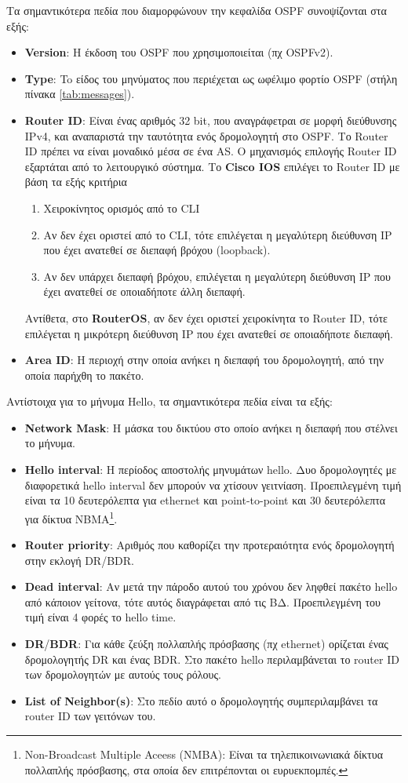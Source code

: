 \documentclass{EdipyLabs} %
\begin{document}
Τα σημαντικότερα πεδία που διαμορφώνουν την κεφαλίδα OSPF συνοψίζονται στα εξής: 
\begin{itemize}
	\item \textbf{Version}: H έκδοση του OSPF που χρησιμοποιείται (πχ OSPFv2).
	\item \textbf{Type}: To είδος του μηνύματος που περιέχεται ως ωφέλιμο φορτίο OSPF  (στήλη πίνακα \ref{tab:messages}).
	\item \textbf{Router ID}\label{router-id}: Είναι ένας αριθμός 32 bit, που αναγράφετραι σε μορφή διεύθυνσης IPv4, και αναπαριστά την ταυτότητα ενός δρομολογητή στο OSPF. Το Router ID πρέπει να είναι μοναδικό μέσα σε ένα AS. Ο μηχανισμός επιλογής Router ID εξαρτάται από το λειτουργικό σύστημα. Το \textbf{Cisco IOS} επιλέγει το Router ID με βάση τα εξής κριτήρια
	\begin{enumerate}
		\item Χειροκίνητος ορισμός από το CLI 
		\item Αν δεν έχει οριστεί από το CLI, τότε επιλέγεται η μεγαλύτερη διεύθυνση IP που έχει ανατεθεί σε διεπαφή βρόχου (loopback).
		\item Αν δεν υπάρχει διεπαφή βρόχου, επιλέγεται η μεγαλύτερη διεύθυνση IP που έχει ανατεθεί σε οποιαδήποτε άλλη διεπαφή. 
	\end{enumerate}
	Αντίθετα, στο \textbf{RouterOS}, αν δεν έχει οριστεί χειροκίνητα το Router ID, τότε επιλέγεται η μικρότερη διεύθυνση IP που έχει ανατεθεί σε οποιαδήποτε διεπαφή.
	\item \textbf{Area ID}: H περιοχή στην οποία ανήκει η διεπαφή του δρομολογητή, από την οποία παρήχθη το πακέτο.
\end{itemize}

Αντίστοιχα για το μήνυμα Hello, τα σημαντικότερα πεδία είναι τα εξής:
\begin{itemize}
	\item \textbf{Network Mask}: H μάσκα του δικτύου στο οποίο ανήκει η διεπαφή που στέλνει το μήνυμα.
	\item \textbf{Hello interval}: Η περίοδος αποστολής μηνυμάτων hello. Δυο δρομολογητές με διαφορετικά hello interval δεν μπορούν να χτίσουν γειτνίαση. Προεπιλεγμένη τιμή είναι τα 10 δευτερόλεπτα για ethernet και point-to-point και 30 δευτερόλεπτα για δίκτυα ΝΒΜΑ\footnote{Non-Broadcast Multiple Aceess (ΝΜΒΑ): Είναι τα τηλεπικοινωνιακά δίκτυα πολλαπλής πρόσβασης, στα οποία δεν επιτρέπονται οι ευρυεκπομπές.}.
	\item \textbf{Router priority}: Αριθμός που καθορίζει την προτεραιότητα ενός δρομολογητή στην εκλογή DR/BDR.
	\item \textbf{Dead interval}: Αν μετά την πάροδο αυτού του χρόνου δεν ληφθεί πακέτο hello από κάποιον γείτονα, τότε αυτός διαγράφεται από τις ΒΔ. Προεπιλεγμένη του τιμή είναι 4 φορές το hello time.
	\item \textbf{DR}/\textbf{BDR}: Για κάθε ζεύξη πολλαπλής πρόσβασης (πχ ethernet) ορίζεται ένας δρομολογητής DR και ένας BDR. Στο πακέτο hello περιλαμβάνεται το router ID των δρομολογητών με αυτούς τους ρόλους.
	\item \textbf{List of Neighbor(s)}: Στο πεδίο αυτό ο δρομολογητής συμπεριλαμβάνει τα router ID των γειτόνων του. 
\end{itemize}
\end{document}
